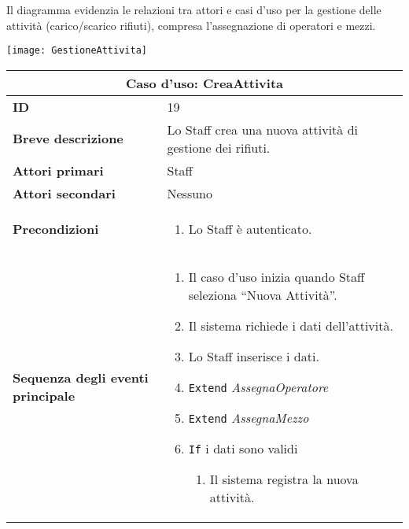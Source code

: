 \documentclass[a4paper]{report}
\begin{document}
\clearpage
{}

Il diagramma evidenzia le relazioni tra attori e casi d’uso per la gestione delle attività (carico/scarico rifiuti), compresa l'assegnazione di operatori e mezzi.

\begin{figure*}[ht]
    \centering
    \texttt{[image: GestioneAttivita]}
\end{figure*}

\clearpage
\begin{table}[H]
\vspace*{-0cm}
\renewcommand{\arraystretch}{1.9}
\begin{tabular}{|p{3.9cm}|p{9.9cm}|}
\hline
\multicolumn{2}{|c|}{\textbf{Caso d’uso: CreaAttivita}} \\ \hline
	\textbf{ID} & 19 \\ \hline
	\textbf{Breve descrizione} & Lo Staff crea una nuova attività di gestione dei rifiuti. \\ \hline
	\textbf{Attori primari} & Staff \\ \hline
	\textbf{Attori secondari} & Nessuno \\ \hline
	\textbf{Precondizioni} & \begin{enumerate}[leftmargin=14pt,label=\arabic*.,labelsep=0.5em,topsep=0pt,partopsep=0pt,parsep=0pt,itemsep=0pt]
    \item Lo Staff è autenticato.
\end{enumerate} \\ \hline
	\textbf{Sequenza degli eventi principale} & \begin{enumerate}[leftmargin=14pt,label=\arabic*.,labelsep=0.5em,topsep=0pt,partopsep=0pt,parsep=0pt,itemsep=0pt]
    \item Il caso d’uso inizia quando Staff seleziona “Nuova Attività”.
    \item Il sistema richiede i dati dell’attività.
    \item Lo Staff inserisce i dati.
    \item \texttt{Extend} \textit{AssegnaOperatore}
    \item \texttt{Extend} \textit{AssegnaMezzo}
    \item \texttt{If} i dati sono validi
    \begin{enumerate}[label=\arabic{enumi}.\arabic*.,leftmargin=22pt,labelsep=0.5em,topsep=0pt,partopsep=0pt,parsep=0pt,itemsep=0pt]
        \item Il sistema registra la nuova attività.

\end{enumerate}
\end{enumerate}
\end{tabular}
\end{table}
\end{document}
